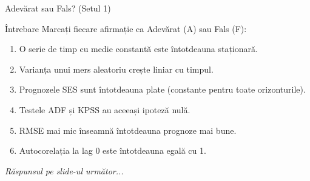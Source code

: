 \documentclass[9pt, aspectratio=169, t]{beamer}
\begin{document}
\begin{frame}{Adevărat sau Fals? (Setul 1)}
    \begin{alertblock}{Întrebare}
        Marcați fiecare afirmație ca Adevărat (A) sau Fals (F):
    \end{alertblock}

    \vspace{0.3cm}

    \begin{enumerate}
        \item O serie de timp cu medie constantă este întotdeauna staționară. \hfill \underline{\hspace{1cm}}
        \vspace{0.2cm}
        \item Varianța unui mers aleatoriu crește liniar cu timpul. \hfill \underline{\hspace{1cm}}
        \vspace{0.2cm}
        \item Prognozele SES sunt întotdeauna plate (constante pentru toate orizonturile). \hfill \underline{\hspace{1cm}}
        \vspace{0.2cm}
        \item Testele ADF și KPSS au aceeași ipoteză nulă. \hfill \underline{\hspace{1cm}}
        \vspace{0.2cm}
        \item RMSE mai mic înseamnă întotdeauna prognoze mai bune. \hfill \underline{\hspace{1cm}}
        \vspace{0.2cm}
        \item Autocorelația la lag 0 este întotdeauna egală cu 1. \hfill \underline{\hspace{1cm}}
    \end{enumerate}

    \vspace{0.3cm}
    \begin{center}
        \textit{Răspunsul pe slide-ul următor...}
    \end{center}
\end{frame}
\end{document}
